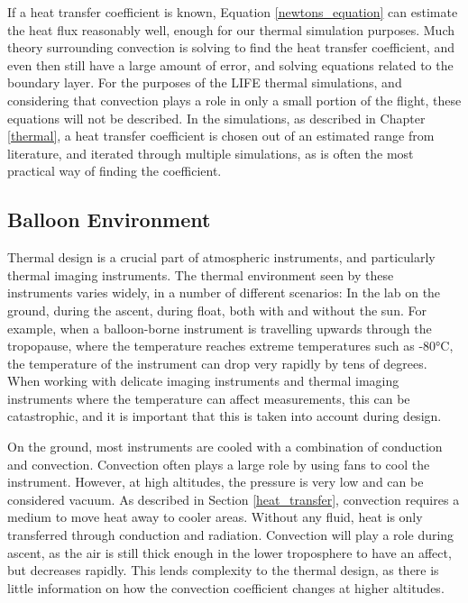 If a heat transfer coefficient is known, Equation \ref{newtons_equation} can estimate the heat flux reasonably well, enough for our thermal simulation purposes. Much theory surrounding convection is solving to find the heat transfer coefficient, and even then still have a large amount of error, and solving equations related to the boundary layer. For the purposes of the LIFE thermal simulations, and considering that convection plays a role in only a small portion of the flight, these equations will not be described. In the simulations, as described in Chapter \ref{thermal}, a heat transfer coefficient is chosen out of an estimated range from literature, and iterated through multiple simulations, as is often the most practical way of finding the coefficient. 

\subsection{Balloon Environment} \label{balloon_env}%
Thermal design is a crucial part of atmospheric instruments, and particularly thermal imaging instruments. The thermal environment seen by these instruments varies widely, in a number of different scenarios: In the lab on the ground, during the ascent, during float, both with and without the sun. For example, when a balloon-borne instrument is travelling upwards through the tropopause, where the temperature reaches extreme temperatures such as -80°C, the temperature of the instrument can drop very rapidly by tens of degrees. When working with delicate imaging instruments and thermal imaging instruments where the temperature can affect measurements, this can be catastrophic, and it is important that this is taken into account during design.

On the ground, most instruments are cooled with a combination of conduction and convection. Convection often plays a large role by using fans to cool the instrument. However, at high altitudes, the pressure is very low and can be considered vacuum. As described in Section \ref{heat_transfer}, convection requires a medium to move heat away to cooler areas. Without any fluid, heat is only transferred through conduction and radiation. Convection will play a role during ascent, as the air is still thick enough in the lower troposphere to have an affect, but decreases rapidly. This lends complexity to the thermal design, as there is little information on how the convection coefficient changes at higher altitudes. 

